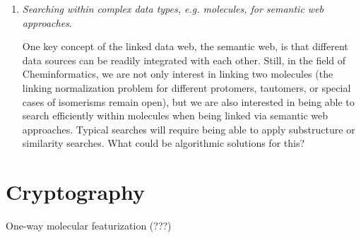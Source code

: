 \documentclass{sig-alternate}
\begin{document}
\begin{enumerate}
\item \emph{Searching within complex data types, e.g. molecules, for semantic web approaches}.

  One key concept of the linked data web, the semantic web, is that
  different data sources can be readily integrated with each
  other. Still, in the field of Cheminformatics, we are not only
  interest in linking two molecules (the linking normalization problem
  for different protomers, tautomers, or special cases of isomerisms
  remain open), but we are also interested in being able to search
  efficiently within molecules when being linked via semantic web
  approaches. Typical searches will require being able to apply
  substructure or similarity searches.  What could be algorithmic
  solutions for this?
\end{enumerate}

\section*{Cryptography}
One-way molecular featurization (???)
\end{document}
